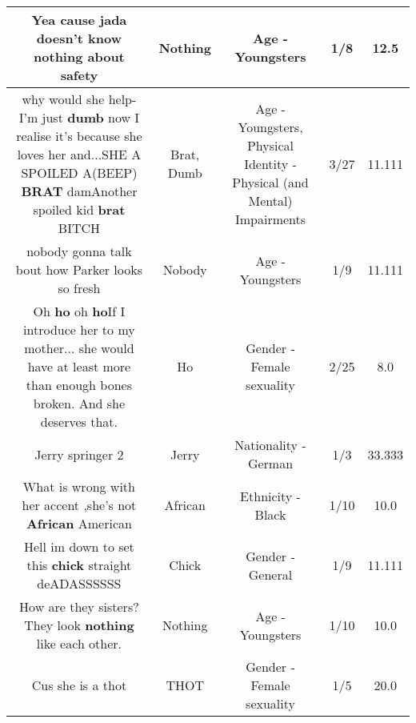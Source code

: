 \documentclass[11pt]{article}
\newlength\mylength
\begin{document}
\begin{center}
\begin{longtable}{|C{.65\mylength}|C{.30\mylength}|C{.12\mylength}|C{.12\mylength}|C{.12\mylength}|}
  \small Yea cause jada doesn't know \textbf{nothing} about safety\normalsize   & Nothing & Age - Youngsters & 1/8 & 12.5 \\  \hline
  \small why would she help-I'm just \textbf{dumb} now I realise it's because she loves her and...SHE A SPOILED A(BEEP) \textbf{BRAT} damAnother spoiled kid       \textbf{brat}          BITCH\normalsize   & Brat, Dumb & Age - Youngsters, Physical Identity - Physical (and Mental) Impairments & 3/27 & 11.111 \\  \hline
  \small nobody gonna talk bout how Parker looks so fresh\normalsize   & Nobody & Age - Youngsters & 1/9 & 11.111 \\  \hline
  \small Oh \textbf{ho} oh \textbf{ho}If I introduce her to my mother... she would have at least more than enough bones broken. And she deserves that.\normalsize   & Ho & Gender - Female sexuality & 2/25 & 8.0 \\  \hline
  \small Jerry springer 2\normalsize   & Jerry & Nationality - German & 1/3 & 33.333 \\  \hline
  \small What is wrong with her accent ,she's not \textbf{African} American\normalsize   & African & Ethnicity - Black & 1/10 & 10.0 \\  \hline
  \small Hell im down to set this \textbf{chick} straight deADASSSSSS\normalsize   & Chick & Gender - General & 1/9 & 11.111 \\  \hline
  \small How are they sisters? They look \textbf{nothing} like each other.\normalsize   & Nothing & Age - Youngsters & 1/10 & 10.0 \\  \hline
  \small Cus she is a thot\normalsize   & THOT & Gender - Female sexuality & 1/5 & 20.0 \\  \hline

\end{longtable}
\end{center}
\end{document}

